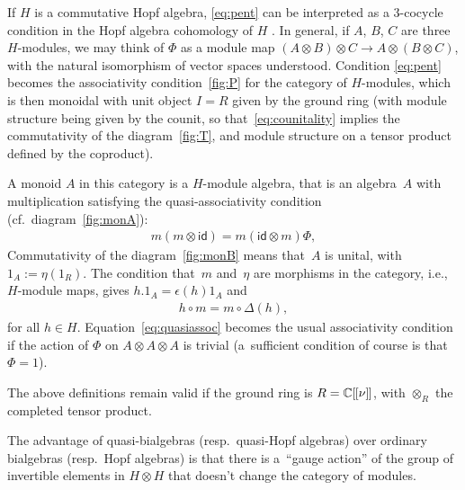 \documentclass[pdftex]{sigma}
\numberwithin{equation}{section}
\theoremstyle{definition}
\newcommand{\C}{\mathbb{C}}
\newcommand{\id}{\mathsf{id}}
\newcommand{\lbrak}{[\hspace{-0.5pt}[}
\newcommand{\rbrak}{]\hspace{-0.5pt}]}
\renewcommand{\hbar}{\nu}
\begin{document}
If $H$ is a commutative Hopf algebra, \eqref{eq:pent} can be interpreted as a $3$-cocycle condition in the Hopf algebra cohomology of $H$ \cite[Section~2.3]{Maj95}. In general, if $A$, $B$, $C$ are three $H$-modules, we may think of $\Phi$ as a module map $(A\otimes B)\otimes C\to A\otimes (B\otimes C)$, with the natural isomorphism of vector spaces understood. Condition \eqref{eq:pent} becomes the associativity condition~\ref{fig:P} for the category of $H$-modules, which is then monoidal with unit object $I=R$ given by the ground ring
(with module structure being given by the counit, so that~\eqref{eq:counitality} implies the commutativity of the diagram~\ref{fig:T}, and module structure on a tensor product def\/ined by the coproduct).

A monoid $A$ in this category is a $H$-module algebra, that is an algebra~$A$ with multiplication satisfying the quasi-associativity condition (cf.~diagram~\ref{fig:monA}):
\begin{gather}\label{eq:quasiassoc}
m(m\otimes\id)=m(\id\otimes m)\Phi ,
\end{gather}
Commutativity of the diagram~\ref{fig:monB} means that~$A$ is unital, with $1_A:=\eta(1_R)$. The condition that~$m$ and~$\eta$ are morphisms in the category, i.e., $H$-module maps, gives $h.1_A=\epsilon(h)1_A$ and
\begin{gather*}
h\circ m=m\circ \Delta(h) ,
\end{gather*}
for all $h\in H$. Equation~\eqref{eq:quasiassoc} becomes the usual associativity condition if the action of $\Phi$ on $A\otimes A\otimes A$ is trivial (a~suf\/f\/icient condition of course is that $\Phi=1$).

The above def\/initions remain valid if the ground ring is $R=\C\lbrak\hbar\rbrak$, with $\otimes_R$ the completed tensor product.

The advantage of quasi-bialgebras (resp.~quasi-Hopf algebras) over ordinary bialgebras (resp.\ Hopf algebras) is that there is a~``gauge action'' of the group of invertible elements in $H\otimes H$ that doesn't change the category of modules.
\end{document}
